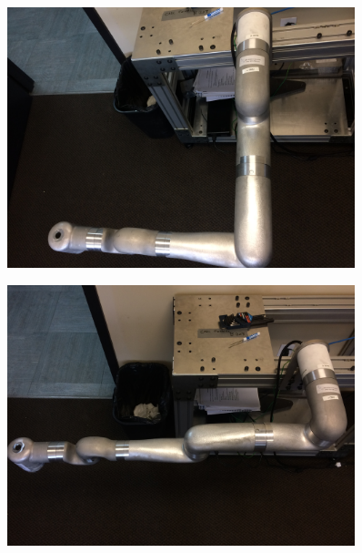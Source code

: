 \begin{figure}
\begin{minipage}{.5\textwidth}
		\label{fig:pose13}
	\end{minipage}
\end{figure}

\begin{figure}
	\centering
	\begin{minipage}{.5\textwidth}
		\centering
		\includegraphics[width=0.9\textwidth]{./images/Pose14}
		\label{fig:pose14}
	\end{minipage}%
	\begin{minipage}{.5\textwidth}
		\centering
		\includegraphics[width=0.9\textwidth]{./images/Pose15}
		\label{fig:pose15}
	\end{minipage}
\end{figure}



